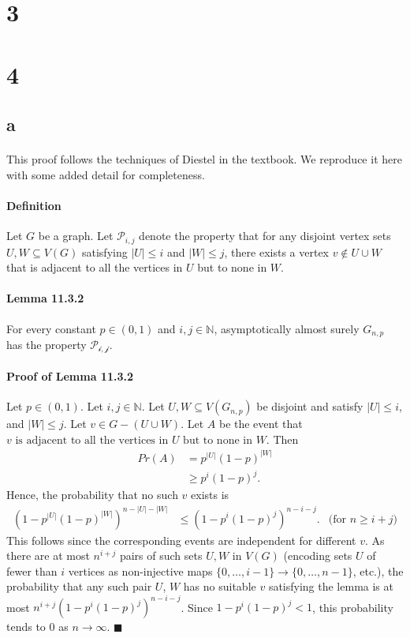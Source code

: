\documentclass[letterpaper,12pt,oneside,onecolumn]{report}
\begin{document}
\section*{3}

\section*{4}
\subsection*{a}
\paragraph{}
This proof follows the techniques of Diestel in the textbook. We reproduce it here with some added detail for completeness.
\paragraph{Definition}
Let $G$ be a graph. Let $\mathcal{P}_{i,j}$ denote the property that for any disjoint vertex sets $U, W \subseteq V(G)$ satisfying $|U| \leq i$ and $|W| \leq j$, there exists a vertex $v \not\in U \cup W$ that is adjacent to all the vertices in $U$ but to none in $W$.
\paragraph{Lemma 11.3.2} For every constant $p \in (0,1)$ and $i,j \in \mathbb{N}$, asymptotically almost surely $G_{n,p}$ has the property $\mathcal{P_{i,j}}$.
\paragraph{Proof of Lemma 11.3.2}
Let $p \in (0,1)$. Let $i,j \in \mathbb{N}$. Let $U, W \subseteq V(G_{n,p})$ be disjoint and satisfy $|U| \leq i$, and $|W| \leq j$. Let $v \in G - (U \cup W)$. Let $A$ be the event that $v \text{ is adjacent to all the vertices in $U$ but to none in $W$}$. Then 
\begin{align*}
Pr(A) &= p^{|U|}(1-p)^{|W|} \\
&\geq p^i(1-p)^j.
\end{align*}
Hence, the probability that no such $v$ exists is 
\begin{align*}
(1 - p^{|U|}(1-p)^{|W|})^{n-|U|-|W|} &\leq (1-p^i(1-p)^j)^{n-i-j}. &\text{(for $n \geq i + j$)}
\end{align*}
This follows since the corresponding events are independent for different $v$. As there are at most $n^{i+j}$ pairs of such sets $U,W$ in $V(G)$ (encoding sets $U$ of fewer than $i$ vertices as non-injective maps $\{0,\dots,i-1\} \rightarrow \{0, \dots, n-1\}$, etc.), the probability that any such pair $U$, $W$ has no suitable $v$ satisfying the lemma is at most $n^{i+j}(1-p^i(1-p)^j)^{n-i-j}$. Since $1-p^i(1-p)^j < 1$, this probability tends to $0$ as $n \rightarrow \infty$. $\blacksquare$
\end{document}
